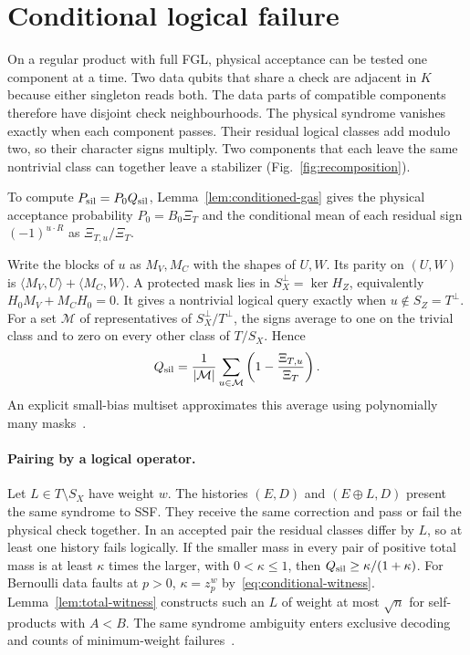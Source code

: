 \documentclass[10pt,twocolumn]{article}
\theoremstyle{definition}
\begin{document}
\section{Conditional logical failure}\label{sec:conditioned}

On a regular product with full FGL, physical acceptance can be tested
one component at a time. Two data qubits that share a check are
adjacent in $K$ because either singleton reads both. The data parts of
compatible components therefore have disjoint check neighbourhoods.
The physical syndrome vanishes exactly when each component passes. Their residual
logical classes add modulo two, so their character signs multiply.
Two components that each leave the same nontrivial class can together
leave a stabilizer
(Fig.~\ref{fig:recomposition}).

To compute $P_{\rm sil}=P_0Q_{\rm sil}$, Lemma~\ref{lem:conditioned-gas}
gives the physical acceptance probability $P_0=B_0\Xi_T$ and the
conditional mean of each residual sign $(-1)^{u\cdot R}$ as
$\Xi_{T,u}/\Xi_T$.

Write the blocks of $u$ as $M_V,M_C$ with the shapes of $U,W$.
Its parity on $(U,W)$ is $\langle M_V,U\rangle+\langle M_C,W\rangle$.
A protected mask lies in $S_X^\perp=\ker H_Z$, equivalently
$H_0M_V+M_CH_0=0$. It gives a nontrivial logical query exactly when
$u\notin S_Z=T^\perp$. For a set $\mathcal M$ of representatives of
$S_X^\perp/T^\perp$, the signs average to one on the trivial class
and to zero on every other class of $T/S_X$. Hence
\[
 Q_{\rm sil}=\frac{1}{|\mathcal M|}\sum_{u\in\mathcal M}
              \left(1-\frac{\Xi_{T,u}}{\Xi_T}\right).
\]
An explicit small-bias multiset approximates this average using
polynomially many masks~\cite{NN93,AGHP92}.

\paragraph{Pairing by a logical operator.}
Let $L\in T\setminus S_X$ have weight $w$. The histories $(E,D)$ and
$(E\oplus L,D)$ present the same syndrome to SSF. They receive the
same correction and pass or fail the physical check together.
In an accepted pair the residual classes differ by $L$, so at least
one history fails logically. If the smaller mass in every pair of
positive total mass is at least $\kappa$ times the larger, with
$0<\kappa\le1$, then $Q_{\rm sil}\ge\kappa/(1+\kappa)$.
For Bernoulli data faults at $p>0$, $\kappa=z_p^w$
by~\eqref{eq:conditional-witness}. Lemma~\ref{lem:total-witness}
constructs such an $L$ of weight at most $\sqrt n$ for self-products
with $A<B$. The same syndrome ambiguity enters exclusive
decoding~\cite{SBB24} and counts of minimum-weight failures~\cite[Sec.~4.3]{BCCY25}.
\end{document}

